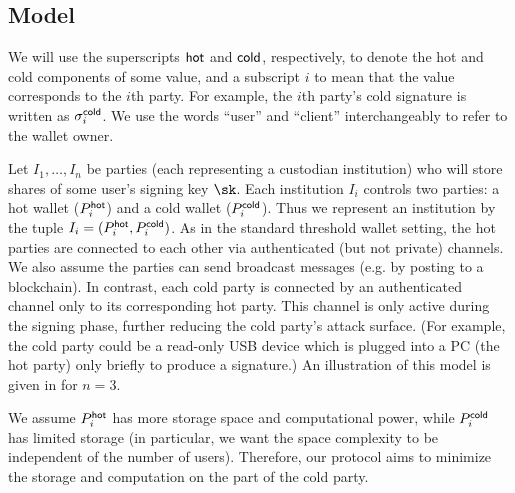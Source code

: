 \subsection{Model}\label{sec:model}



We will use the superscripts $\mathsf{hot}$ and $\mathsf{cold}$, respectively, to denote the hot and cold components of some value, and a subscript $i$ to mean that the value corresponds to the $i$th party. For example, the $i$th party's cold signature is written as $\sigma_i^{\mathsf{cold}}$. We use the words ``user'' and ``client'' interchangeably to refer to the wallet owner. 

Let $I_1, \ldots, I_n$ be parties (each representing a custodian institution) who will store shares of some user's signing key $\sk$. Each institution $I_i$ controls two parties: a hot wallet ($P_i^{\mathsf{hot}}$) and a cold wallet ($P_i^{\mathsf{cold}}$). Thus we represent an institution by the tuple $I_i = (P_i^{\mathsf{hot}}, P_i^{\mathsf{cold}})$. 
As in the standard threshold wallet setting, the hot parties are connected to each other via authenticated (but not private) channels. We also assume the parties can send broadcast messages (e.g. by posting to a blockchain).  %
In contrast, each cold party is connected by an authenticated channel only to its corresponding hot party. This channel is only active during the signing phase, further reducing the cold party's attack surface. (For example, the cold party could be a read-only USB device which is plugged into a PC (the hot party) only briefly to produce a signature.) 
An illustration of this model is given in  for $n=3$.

We assume $P_i^{\mathsf{hot}}$ has more storage space and computational power, while $P_i^{\mathsf{cold}}$ has limited storage (in particular, we want the space complexity to be independent of the number of users). 
Therefore, our protocol aims to minimize the storage and computation on the part of the cold party.